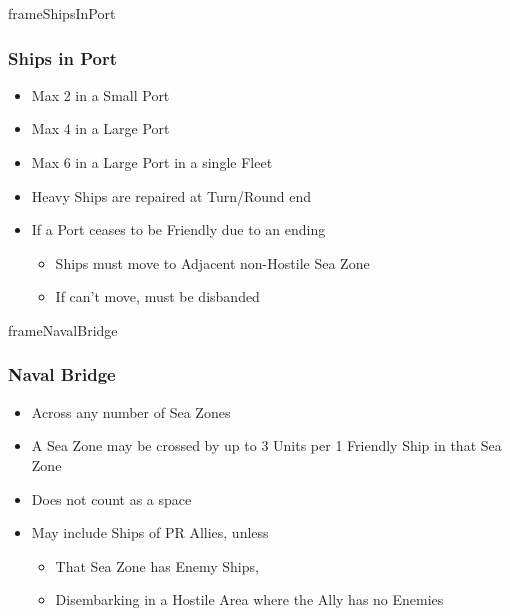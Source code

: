 \documentclass[10pt]{article}
\newlength{\fhNavalBridge} \setlength\fhNavalBridge{9\baselineskip}
\newlength{\fhShipsInPort} \setlength\fhShipsInPort{11\baselineskip}
\begin{document}
\begin{dynamiccontents*}{frameShipsInPort}\begin{eubox}{\fhShipsInPort}
	\subsubsection*{Ships in Port }
	\begin{itemize}
		\item Max 2 in a Small Port
		\item Max 4 in a Large Port
		\item Max 6 in a Large Port in a single Fleet
		\item Heavy Ships are repaired at Turn/Round end
		\item If a Port ceases to be Friendly due to an ending \alliance
		\begin{itemize}
			\item Ships must move to Adjacent non-Hostile Sea Zone
			\item If can't move, must be disbanded 
		\end{itemize}
	\end{itemize}
\end{eubox}\end{dynamiccontents*}

\begin{dynamiccontents*}{frameNavalBridge}\begin{eubox}{\fhNavalBridge}
	\subsubsection*{Naval Bridge }
	\begin{itemize}
		\item Across any number of Sea Zones
		\item A Sea Zone may be crossed by up to 3 Units per 1 Friendly Ship in that Sea Zone
		\item Does not count as a space
		\item May include Ships of PR Allies, unless
		\begin{itemize}
			\item That Sea Zone has Enemy Ships, 
			\item Disembarking in a Hostile Area where the Ally has no Enemies
		\end{itemize}
	\end{itemize}
\end{eubox}\end{dynamiccontents*}
\end{document}
